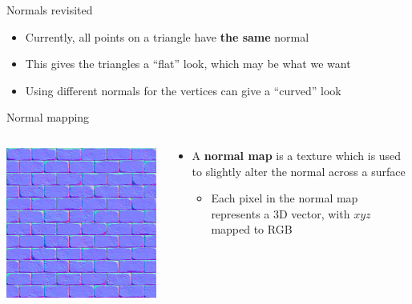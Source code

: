 \begin{frame}{Normals revisited}
	\begin{itemize}
		\pause\item Currently, all points on a triangle have \textbf{the same} normal
		\pause\item This gives the triangles a ``flat'' look, which may be what we want
		\pause\item Using different normals for the vertices can give a ``curved'' look
	\end{itemize}
\end{frame}

\begin{frame}{Normal mapping}
	\pause
	\begin{columns}
		\begin{column}{0.33\textwidth}
			\includegraphics[width=\textwidth]{normal_map}
		\end{column}
		\begin{column}{0.65\textwidth}
			\begin{itemize}
				\item A \textbf{normal map} is a texture which is used to slightly alter the normal
					across a surface
					\begin{itemize}
						\pause\item Each pixel in the normal map represents a 3D vector, with $xyz$ mapped to RGB

\end{itemize}
\end{itemize}
\end{column}
\end{columns}
\end{frame}
